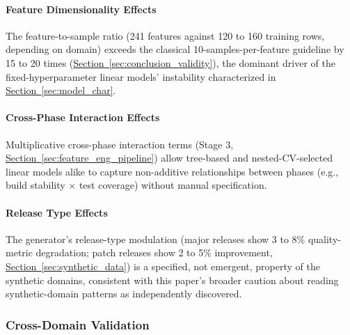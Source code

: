 \documentclass[technologies,article,submit,pdftex,moreauthors]{Definitions/mdpi}
\begin{document}
\paragraph{Feature Dimensionality Effects}\label{sec:dimensionality_effects}

The feature-to-sample ratio (241 features against 120 to 160 training rows, depending on domain) exceeds the classical 10-samples-per-feature guideline by 15 to 20 times (\hyperref[sec:conclusion_validity]{Section~\ref*{sec:conclusion_validity}}), the dominant driver of the fixed-hyperparameter linear models' instability characterized in \hyperref[sec:model_char]{Section~\ref*{sec:model_char}}.

\paragraph{Cross-Phase Interaction Effects}\label{sec:cross_phase_effects}

Multiplicative cross-phase interaction terms (Stage 3, \hyperref[sec:feature_eng_pipeline]{Section~\ref*{sec:feature_eng_pipeline}}) allow tree-based and nested-CV-selected linear models alike to capture non-additive relationships between phases (e.g., build stability \(\times\) test coverage) without manual specification.

\paragraph{Release Type Effects}\label{sec:release_type_effects}

The generator's release-type modulation (major releases show 3 to 8\% quality-metric degradation; patch releases show 2 to 5\% improvement, \hyperref[sec:synthetic_data]{Section~\ref*{sec:synthetic_data}}) is a specified, not emergent, property of the synthetic domains, consistent with this paper's broader caution about reading synthetic-domain patterns as independently discovered.

\subsubsection{Cross-Domain Validation}\label{sec:cross_domain}
\end{document}
